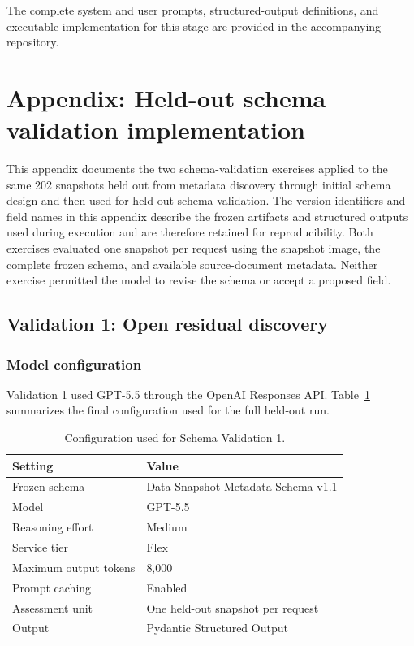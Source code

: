 \documentclass{article}
\begin{document}
The complete system and user prompts, structured-output definitions, and executable implementation for this stage are provided in the accompanying repository.

\section{Appendix: Held-out schema validation implementation}
\label{appendix:schema_validation}

This appendix documents the two schema-validation exercises applied to the same 202 snapshots held out from metadata discovery through initial schema design and then used for held-out schema validation. The version identifiers and field names in this appendix describe the frozen artifacts and structured outputs used during execution and are therefore retained for reproducibility. Both exercises evaluated one snapshot per request using the snapshot image, the complete frozen schema, and available source-document metadata. Neither exercise permitted the model to revise the schema or accept a proposed field.

\subsection{Validation 1: Open residual discovery}

\subsubsection{Model configuration}

Validation 1 used GPT-5.5 through the OpenAI Responses API. Table~\ref{tab:schema_validation1_configuration} summarizes the final configuration used for the full held-out run.

\begin{table}[!ht]
    \centering
    \caption{Configuration used for Schema Validation 1.}
    \label{tab:schema_validation1_configuration}
    \begin{tabular}{ll}
    \toprule
    \textbf{Setting} & \textbf{Value} \\
    \midrule
    Frozen schema & Data Snapshot Metadata Schema v1.1 \\
    Model & GPT-5.5 \\
    Reasoning effort & Medium \\
    Service tier & Flex \\
    Maximum output tokens & 8,000 \\
    Prompt caching & Enabled \\
    Assessment unit & One held-out snapshot per request \\
    Output & Pydantic Structured Output \\
    \bottomrule
    \end{tabular}
\end{table}
\end{document}
